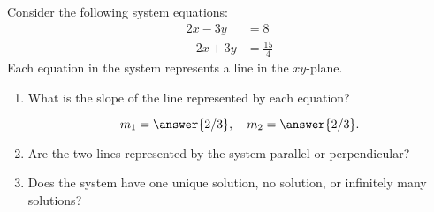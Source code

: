 \documentclass{ximera}
\author{Parisa Fatheddin}
\begin{document}
\begin{exercise}
  Consider the following system equations:
  \begin{align*}
    2x-3y &= 8\\
    -2x +3y &= \frac{15}{4}
  \end{align*}
  Each equation in the system represents a line in the $xy$-plane.

  \begin{enumerate}
  \item What is the slope of the line represented by each equation?
    \begin{prompt}
      \[
        m_{1} = \answer{2/3}, \quad m_{2} = \answer{2/3}.
      \]
    \end{prompt}
  \item Are the two lines represented by the system parallel or perpendicular?
    \begin{prompt}
      \begin{multipleChoice}
      \end{multipleChoice}
    \end{prompt}
  \item Does the system have one unique solution, no solution, or infinitely many solutions?
    \begin{prompt}
      \begin{multipleChoice}
      \end{multipleChoice}
    \end{prompt}
  \end{enumerate}
\end{exercise}
\end{document}
